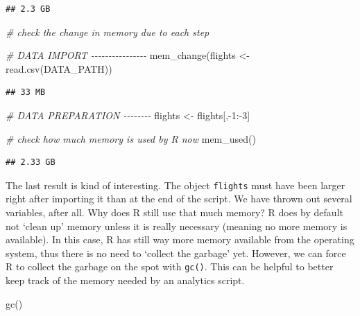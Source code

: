 \documentclass[
  12pt,
]{style/krantz}
\newenvironment{Shaded}{\begin{snugshade}}{\end{snugshade}}
\newcommand{\CommentTok}[1]{\textcolor[rgb]{0.56,0.35,0.01}{\textit{#1}}}
\newcommand{\DecValTok}[1]{\textcolor[rgb]{0.00,0.00,0.81}{#1}}
\newcommand{\FunctionTok}[1]{\textcolor[rgb]{0.00,0.00,0.00}{#1}}
\newcommand{\NormalTok}[1]{#1}
\newcommand{\OtherTok}[1]{\textcolor[rgb]{0.56,0.35,0.01}{#1}}
\newcommand{\SpecialCharTok}[1]{\textcolor[rgb]{0.00,0.00,0.00}{#1}}
\begin{document}
\begin{verbatim}
## 2.3 GB
\end{verbatim}

\begin{Shaded}
\begin{Highlighting}[]
\CommentTok{\# check the change in memory due to each step}

\CommentTok{\# DATA IMPORT {-}{-}{-}{-}{-}{-}{-}{-}{-}{-}{-}{-}{-}{-}{-}{-}}
\FunctionTok{mem\_change}\NormalTok{(flights }\OtherTok{\textless{}{-}} \FunctionTok{read.csv}\NormalTok{(DATA\_PATH))}
\end{Highlighting}
\end{Shaded}

\begin{verbatim}
## 33 MB
\end{verbatim}

\begin{Shaded}
\begin{Highlighting}[]
\CommentTok{\# DATA PREPARATION {-}{-}{-}{-}{-}{-}{-}{-}}
\NormalTok{flights }\OtherTok{\textless{}{-}}\NormalTok{ flights[,}\SpecialCharTok{{-}}\DecValTok{1}\SpecialCharTok{:{-}}\DecValTok{3}\NormalTok{]}

\CommentTok{\# check how much memory is used by R now}
\FunctionTok{mem\_used}\NormalTok{()}
\end{Highlighting}
\end{Shaded}

\begin{verbatim}
## 2.33 GB
\end{verbatim}

The last result is kind of interesting. The object \texttt{flights} must have been larger right after importing it than at the end of the script. We have thrown out several variables, after all. Why does R still use that much memory? R does by default not `clean up' memory unless it is really necessary (meaning no more memory is available). In this case, R has still way more memory available from the operating system, thus there is no need to `collect the garbage' yet. However, we can force R to collect the garbage on the spot with \texttt{gc()}. This can be helpful to better keep track of the memory needed by an analytics script.

\begin{Shaded}
\begin{Highlighting}[]
\FunctionTok{gc}\NormalTok{()}
\end{Highlighting}
\end{Shaded}
\end{document}

